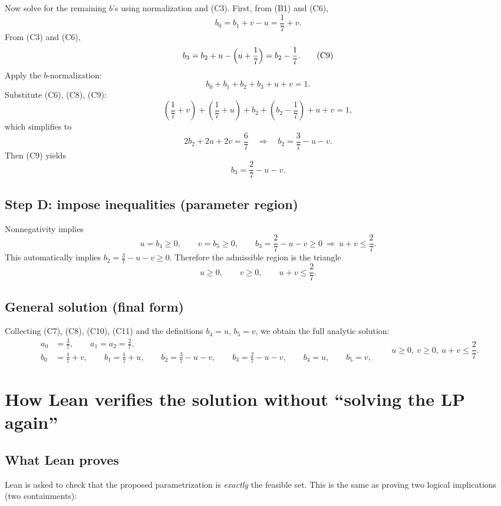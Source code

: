 \documentclass[11pt]{article}
\begin{document}
Now solve for the remaining $b$'s using normalization and (C3).
First, from (B1) and (C6),
\[
b_0=b_1+v-u=\frac{1}{7}+v. \tag{C8}
\]
From (C3) and (C6),
\[
b_3=b_2+u-\Bigl(u+\frac{1}{7}\Bigr)=b_2-\frac{1}{7}. \tag{C9}
\]
Apply the $b$-normalization:
\[
b_0+b_1+b_2+b_3+u+v=1.
\]
Substitute (C6), (C8), (C9):
\[
\left(\frac{1}{7}+v\right)+\left(\frac{1}{7}+u\right)+b_2+\left(b_2-\frac{1}{7}\right)+u+v=1,
\]
which simplifies to
\[
2b_2+2u+2v=\frac{6}{7}
\quad\Longrightarrow\quad
b_2=\frac{3}{7}-u-v. \tag{C10}
\]
Then (C9) yields
\[
b_3=\frac{2}{7}-u-v. \tag{C11}
\]

\subsection{Step D: impose inequalities (parameter region)}

Nonnegativity implies
\[
u=b_4\ge 0,\qquad v=b_5\ge 0,
\qquad
b_3=\frac{2}{7}-u-v\ge 0\ \Longrightarrow\ u+v\le \frac{2}{7}.
\]
This automatically implies $b_2=\frac{3}{7}-u-v\ge 0$.
Therefore the admissible region is the triangle
\[
\boxed{u\ge 0,\qquad v\ge 0,\qquad u+v\le \frac{2}{7}.}
\]

\subsection{General solution (final form)}

Collecting (C7), (C8), (C10), (C11) and the definitions $b_4=u$, $b_5=v$, we obtain the full analytic solution:
\[
\boxed{
\begin{aligned}
a_0&=\frac{3}{7},\qquad a_1=a_2=\frac{2}{7},\\
b_0&=\frac{1}{7}+v,\qquad b_1=\frac{1}{7}+u,\qquad
b_2=\frac{3}{7}-u-v,\qquad
b_3=\frac{2}{7}-u-v,\qquad
b_4=u,\qquad b_5=v,
\end{aligned}}
\qquad
\boxed{u\ge 0,\ v\ge 0,\ u+v\le\frac{2}{7}.}
\]

\section{How Lean verifies the solution without ``solving the LP again''}

\subsection{What Lean proves}

Lean is asked to check that the proposed parametrization is \emph{exactly} the feasible set.
This is the same as proving two logical implications (two containments):
\end{document}
